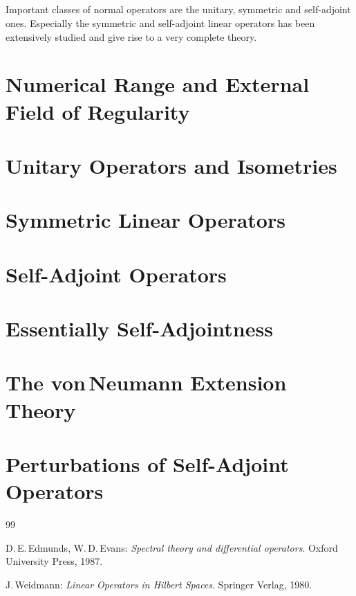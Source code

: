 \documentclass[11pt,twoside]{article}
\begin{document}
\subparagraph{}
Important classes of normal operators are the unitary, symmetric and
self-adjoint ones.
Especially the symmetric and self-adjoint linear operators has been
extensively studied and give rise to a very complete theory.

\section{Numerical Range and External Field of Regularity}
\section{Unitary Operators and Isometries}
\section{Symmetric Linear Operators}
\section{Self-Adjoint Operators}
\section{Essentially Self-Adjointness}
\section{The von\,Neumann Extension Theory}
\section{Perturbations of Self-Adjoint Operators}

\vspace{5mm}
\begin{thebibliography}{99}
\begin{small}

 D.\,E.\,Edmunds, W.\,D.\,Evans:
\textit{Spectral theory and differential operators}.
Oxford University Press, 1987.

 J.\,Weidmann:
\textit{Linear Operators in Hilbert Spaces}.
Springer Verlag, 1980.

\end{small}
\end{thebibliography}

\newpage
\thispagestyle{empty}
\end{document}
